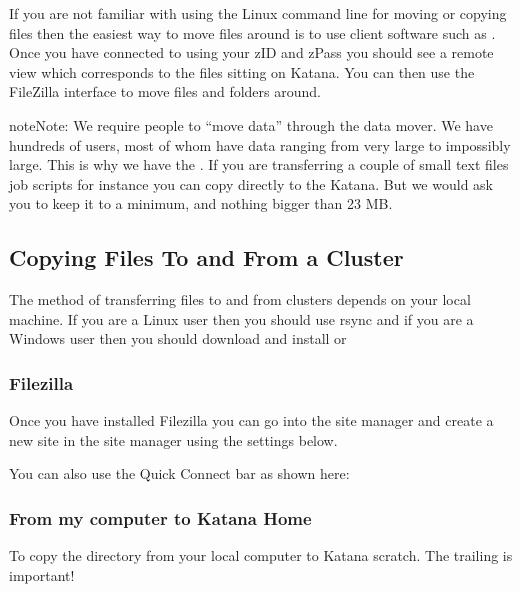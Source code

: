 \documentclass[letterpaper,10pt,english]{sphinxmanual}
\begin{document}
If you are not familiar with using the Linux command line for moving or copying files then the easiest way to move files around is to use client software such as . Once you have connected to  using your zID and zPass you should see a remote view which corresponds to the files sitting on Katana. You can then use the FileZilla interface to move files and folders around.

\begin{sphinxadmonition}{note}{Note:}
We require people to “move data” through the data mover. We have hundreds of users, most of whom have data ranging from very large to impossibly large. This is why we have the . If you are transferring a couple of small text files \sphinxhyphen{} job scripts for instance \sphinxhyphen{} you can copy directly to the Katana. But we would ask you to keep it to a minimum, and nothing bigger than 2\sphinxhyphen{}3 MB.
\end{sphinxadmonition}


\subsection{Copying Files To and From a Cluster}
\label{\detokenize{storage/kdm:copying-files-to-and-from-a-cluster}}
The method of transferring files to and from clusters depends on your local machine. If you are a Linux user then you should use rsync and if you are a Windows user then you should download and install  or 


\subsubsection{Filezilla}
\label{\detokenize{storage/kdm:filezilla}}\label{\detokenize{storage/kdm:using-filezilla}}
Once you have installed Filezilla you can go into the site manager and create a new site in the site manager using the settings below.

\noindent{}

You can also use the Quick Connect bar as shown here:

\noindent{}


\subsubsection{From my computer to Katana Home}
\label{\detokenize{storage/kdm:from-my-computer-to-katana-home}}
To copy the directory  from your local computer to Katana scratch. The trailing \sphinxcode{\sphinxupquote{:}} is important!
\end{document}

